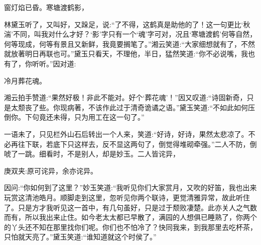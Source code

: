 \begin{poem}
    \begin{pl}窗灯焰已昏。寒塘渡鹤影，\end{pl}
\end{poem}


\begin{parag}
    林黛玉听了，又叫好，又跺足，说:“了不得，这鹤真是助他的了！这一句更比‘秋湍’不同，叫我对什么才好？‘影’字只有一个‘魂’字可对，况且‘寒塘渡鹤’何等自然，何等现成，何等有景且又新鲜，我竟要搁笔了。”湘云笑道:“大家细想就有了，不然就放著明日再联也可。”黛玉只看天，不理他，半日，猛然笑道:“你不必说嘴，我也有了，你听听。”因对道:
\end{parag}


\begin{poem}
    \begin{pl}冷月葬花魂。\end{pl}
\end{poem}


\begin{parag}
    湘云拍手赞道:“果然好极！非此不能对。好个‘葬花魂’！”因又叹道:“诗固新奇，只是太颓丧了些。你现病著，不该作此过于清奇诡谲之语。”黛玉笑道:“不如此如何压倒你。下句竟还未得，只为用工在这一句了。”
\end{parag}


\begin{parag}
    一语未了，只见栏外山石后转出一个人来，笑道:“好诗，好诗，果然太悲凉了。不必再往下联，若底下只这样去，反不显这两句了，倒觉得堆砌牵强。”二人不防，倒唬了一跳。细看时，不是别人，却是妙玉。二人皆诧异，\begin{note}庚双夹:原可诧异，余亦诧异。\end{note}因问:“你如何到了这里？”妙玉笑道:“我听见你们大家赏月，又吹的好笛，我也出来玩赏这清池皓月。顺脚走到这里，忽听见你两个联诗，更觉清雅异常，故此听住了。只是方才我听见这一首中，有几句虽好，只是过于颓败凄楚。此亦关人之气数而有，所以我出来止住。如今老太太都已早散了，满园的人想俱已睡熟了，你两个的丫头还不知在那里找你们呢。你们也不怕冷了？快同我来，到我那里去吃杯茶，只怕就天亮了。”黛玉笑道:“谁知道就这个时侯了。”
\end{parag}


